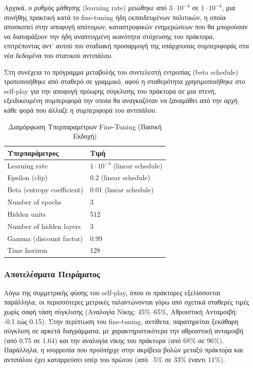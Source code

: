 \documentclass[12pt]{article}
\begin{document}
Αρχικά, ο ρυθμός μάθησης (learning rate) μειώθηκε από $3\cdot10^{-4}$ σε $1\cdot10^{-4}$, μια συνήθης πρακτική κατά το fine-tuning ήδη εκπαιδευμένων πολιτικών, η οποία αποσκοπεί στην αποφυγή απότομων, καταστροφικών ενημερώσεων που θα μπορούσαν να διαταράξουν την ήδη αναπτυγμένη ικανότητα στόχευσης του πράκτορα, επιτρέποντας αντ' αυτού πιο σταδιακή προσαρμογή της υπάρχουσας συμπεριφοράς στα νέα δεδομένα του στατικού αντιπάλου. 

Στη συνέχεια το πρόγραμμα μεταβολής του συντελεστή εντροπίας (beta schedule) τροποποιήθηκε από σταθερό σε γραμμικό, αφού η σταθερότητα χρησιμοποιήθηκε στο self-play για την αποφυγή πρόωρης σύγκλισης του πράκτορα σε μια στενή, εξειδικευμένη συμπεριφορά την οποία θα αναγκαζόταν να ξαναμάθει από την αρχή κάθε φορά που άλλαζε η συμπεριφορά του αντιπάλου.

\begin{table}[H]
	\centering
	\caption{Διαμόρφωση Υπερπαραμέτρων Fine-Tuning (Βασική Εκδοχή)}
	\label{tab:ft-base-params}
	\begin{tabular}{ll}
		\hline
		\textbf{Υπερπαράμετρος} & \textbf{Τιμή} \\
		\hline
		Learning rate & $1 \cdot 10^{-4}$ (linear schedule) \\
		Epsilon (clip) & 0.2 (linear schedule) \\
		Beta (entropy coefficient) & 0.01 (linear schedule) \\
		Number of epochs & 3 \\
		Hidden units & 512 \\
		Number of hidden layers & 3 \\
		Gamma (discount factor) & 0.99 \\
		Time horizon & 128 \\
		\hline
	\end{tabular}
\end{table}

\subsubsection{Αποτελέσματα Πειράματος}
Λόγω της συμμετρικής φύσης του self-play, όπου οι πράκτορες εξελίσσονται παράλληλα, οι περισσότερες μετρικές ταλαντώνονται γύρω από σχετικά σταθερές τιμές χωρίς σαφή τάση σύγκλισης (Αναλογία Νίκης: 45\%–65\%, Αθροιστική Ανταμοιβή: -0.1 εώς 0.15). Στην περίπτωση του fine-tuning, αντίθετα, παρατηρείται ξεκάθαρη σύγκλιση σε αρκετά διαγράμματα, με χαρακτηριστικότερα την αθροιστική ανταμοιβή (από 0.75 σε 1.64) και την αναλογία νίκης του πράκτορα (από 68\% σε 96\%). Παράλληλα, η ισορροπία που προϋπήρχε στην ακρίβεια βολών μεταξύ πράκτορα και αντιπάλου έχει καταρρεύσει υπέρ του πρώτου (από ~5\% σε 33\% έναντι 11\%).
\end{document}
